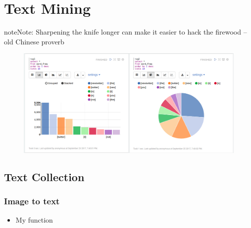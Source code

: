 \documentclass[letterpaper,11pt,english]{sphinxmanual}
\begin{document}
\chapter{Text Mining}
\label{textmining:yassine-alouini}\label{textmining:text-mining}\label{textmining::doc}\label{textmining:textmining}
\begin{notice}{note}{Note:}
Sharpening the knife longer can make it easier to hack the firewood -- old Chinese proverb
\end{notice}
\begin{figure}[htbp]
\centering

\includegraphics{sen_word_freq.png}
\end{figure}


\section{Text Collection}
\label{textmining:textcollection}\label{textmining:text-collection}

\subsection{Image to text}
\label{textmining:img2text}\label{textmining:image-to-text}\begin{itemize}
\item {} 
My  function

\end{itemize}
\end{document}
